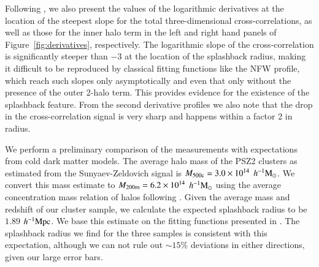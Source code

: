 \documentclass[iop, apjl, twocolappendix, numberedappendix]{emulateapj}
\def\mpch{h^{-1}{\rm Mpc}}
\def\msunh{h^{-1}{\rm M_{\odot}}}
\begin{document}
Following \citet{baxter2017halo}, we also present the values of the
logarithmic derivatives at the location of the steepest slope for
the total three-dimensional cross-correlations, as well as those for
the inner halo term in the left and right hand panels of
Figure~\ref{fig:derivatives}, respectively. The logarithmic slope of the 
cross-correlation is significantly steeper than $-3$ at the location 
of the splashback radius, making it difficult to
be reproduced by classical fitting functions like the NFW profile,
which reach such slopes only asymptotically and even that only
without the presence of the outer 2-halo term. This provides
evidence for the existence of the splashback feature. From the second
derivative profiles we also note that the drop in the cross-correlation
signal is very sharp and happens within a factor 2 in radius.

We perform a preliminary comparison of the measurements with
expectations from cold dark matter models. The average halo mass of
the PSZ2 clusters as estimated from the Sunyaev-Zeldovich signal
is $M_{\rm 500c}=3.0\times10^{14}$ $\msunh$. We convert this mass
estimate to $M_{\rm 200m}=6.2\times10^{14}$ $\msunh$ using the average
concentration mass relation of halos following
\citet{HuKravtsov:2003}. Given the average mass and redshift of our
cluster sample, we calculate the expected splashback radius to be
$1.89$ $\mpch$. We base this estimate on the fitting functions
presented in \citet{more2015splashback}. The splashback radius we
find for the three samples is consistent with this expectation,
although we can not rule out $\sim 15\%$ deviations in either directions,
given our large error bars.
\end{document}
